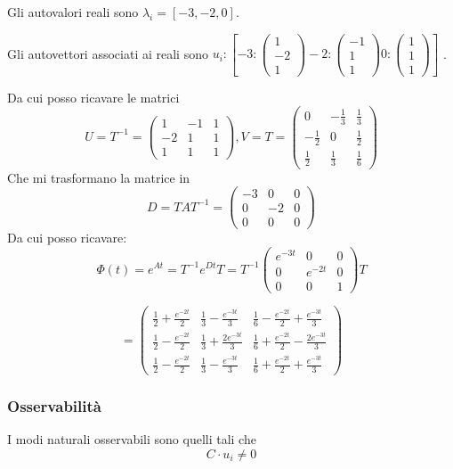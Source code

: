 \documentclass{article}
\begin{document}
Gli autovalori reali sono $\lambda_i = [-3, -2, 0]$.

Gli autovettori associati ai reali sono $ u_i: [  -3: \left(\begin{matrix}1\\-2\\1\end{matrix}\right)-2: \left(\begin{matrix}-1\\1\\1\end{matrix}\right)0: \left(\begin{matrix}1\\1\\1\end{matrix}\right) ]$
.

Da cui posso ricavare le matrici \[U=T^{-1} = \left(\begin{matrix}1 & -1 & 1\\-2 & 1 & 1\\1 & 1 & 1\end{matrix}\right), V = T = \left(\begin{matrix}0 & - \frac{1}{3} & \frac{1}{3}\\- \frac{1}{2} & 0 & \frac{1}{2}\\\frac{1}{2} & \frac{1}{3} & \frac{1}{6}\end{matrix}\right)\]
Che mi trasformano la matrice in \[ D = TAT^{-1} = \left(\begin{matrix}-3 & 0 & 0\\0 & -2 & 0\\0 & 0 & 0\end{matrix}\right) \]
Da cui posso ricavare: \[ \Phi(t) = e^{At} = T^{-1} e^{Dt} T =  T^{-1} \left(\begin{matrix}e^{- 3 t} & 0 & 0\\0 & e^{- 2 t} & 0\\0 & 0 & 1\end{matrix}\right) T\]

\[ = \left(\begin{matrix}\frac{1}{2} + \frac{e^{- 2 t}}{2} & \frac{1}{3} - \frac{e^{- 3 t}}{3} & \frac{1}{6} - \frac{e^{- 2 t}}{2} + \frac{e^{- 3 t}}{3}\\\frac{1}{2} - \frac{e^{- 2 t}}{2} & \frac{1}{3} + \frac{2 e^{- 3 t}}{3} & \frac{1}{6} + \frac{e^{- 2 t}}{2} - \frac{2 e^{- 3 t}}{3}\\\frac{1}{2} - \frac{e^{- 2 t}}{2} & \frac{1}{3} - \frac{e^{- 3 t}}{3} & \frac{1}{6} + \frac{e^{- 2 t}}{2} + \frac{e^{- 3 t}}{3}\end{matrix}\right) \]\subsubsection{Osservabilità}
 I modi naturali osservabili sono quelli tali che 
\[ C \cdot u_i   \neq 0\]
\end{document}
